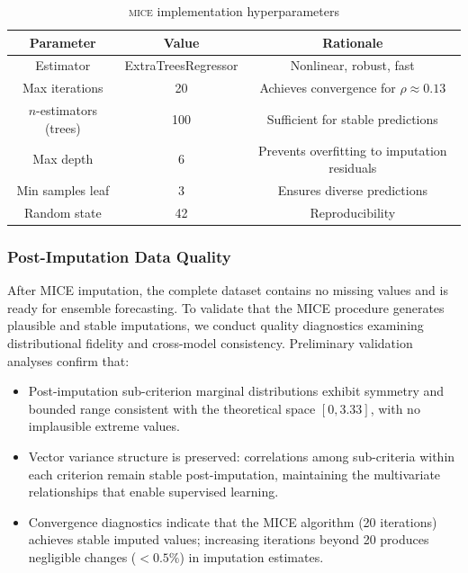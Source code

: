 \documentclass[12pt,a4paper]{article}
\newcommand{\MICE}{\textsc{mice}\xspace}
\begin{document}
\begin{table}[!ht]
\centering
\caption{\MICE implementation hyperparameters}
\label{tab:mice_hyperparams}
\small
\begin{tabular}{c c c}
\toprule
\textbf{Parameter} & \textbf{Value} & \textbf{Rationale} \\
\midrule
Estimator & ExtraTreesRegressor & Nonlinear, robust, fast \\
Max iterations & 20 & Achieves convergence for $\rho \approx 0.13$ \\
$n$-estimators (trees) & 100 & Sufficient for stable predictions \\
Max depth & 6 & Prevents overfitting to imputation residuals \\
Min samples leaf & 3 & Ensures diverse predictions \\
Random state & 42 & Reproducibility \\
\bottomrule
\end{tabular}
\end{table}

\subsubsection{Post-Imputation Data Quality}

After MICE imputation, the complete dataset contains no missing values and is ready for ensemble forecasting. To validate that the MICE procedure generates plausible and stable imputations, we conduct quality diagnostics examining distributional fidelity and cross-model consistency. Preliminary validation analyses confirm that:
\begin{itemize}[itemsep=2pt]
  \item Post-imputation sub-criterion marginal distributions exhibit symmetry and bounded range consistent with the theoretical space $[0, 3.33]$, with no implausible extreme values.
  \item Vector variance structure is preserved: correlations among sub-criteria within each criterion remain stable post-imputation, maintaining the multivariate relationships that enable supervised learning.
  \item Convergence diagnostics indicate that the MICE algorithm (20 iterations) achieves stable imputed values; increasing iterations beyond 20 produces negligible changes ($< 0.5\%$) in imputation estimates.
\end{itemize}
\end{document}
